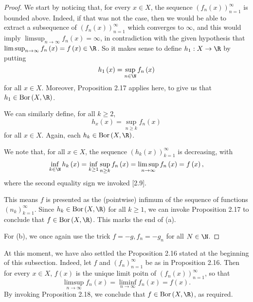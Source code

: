 \documentclass[pmath450]{subfiles}
\begin{document}
    \begin{proof}
        We start by noticing that, for every $x\in X$, the sequence $\left( f_{n}\left( x \right) \right)^{\infty}_{n=1}$ is bounded above. Indeed, if that was not the case, then we would be able to extract a subsequence of $\left( f_{n}\left( x \right) \right)^{\infty}_{n=1}$ which converges to $\infty$, and this would imply $\limsup_{n\to\infty}f_n\left( x \right)=\infty$, in contradiction with the given hypothesis that $\limsup_{n\to\infty}f_n\left( x \right)=f\left( x \right)\in\R$. So it makes sense to define $h_1:X\to\R$ by putting
        \begin{equation*}
            h_1\left( x \right) = \sup_{n\in\N}f_n\left( x \right)
        \end{equation*}
        for all $x\in X$. Moreover, Proposition 2.17 applies here, to give us that $h_1\in\bor\left( X,\R \right)$.

        We can similarly define, for all $k\geq 2$,
        \begin{equation*}
            h_x\left( x \right) = \sup_{n\geq k}f_n\left( x \right)
        \end{equation*}
        for all $x\in X$. Again, each $h_k\in\bor\left( X,\R \right)$.

        We note that, for all $x\in X$, the sequence $\left( h_{k}\left( x \right) \right)^{\infty}_{k=1}$ is decreasing, with
        \begin{equation*}
            \inf_{k\in\N}h_k\left( x \right) = \inf_{k\geq 1}\sup_{n\geq k}f_n\left( x \right) = \limsup_{n\to\infty}f_n\left( x \right)=f\left( x \right),
        \end{equation*}
        where the second equality sign we invoked [2.9].

        This means $f$ is presented as the (pointwise) infimum of the sequence of functions $\left( n_{k} \right)^{\infty}_{k=1}$. Since $h_k\in\bor\left( X,\R \right)$ for all $k\geq 1$, we can invoke Proposition 2.17 to conclude that $f\in\bor\left( X,\R \right)$. This marks the end of (a).

        For (b), we once again use the trick $f=-g, f_n=-g_n$ for all $N\in\N$.
    \end{proof}

    \np At this moment, we have also settled the Proposition 2.16 stated at the beginning of this subsection. Indeed, let $f$ and $\left( f_{n} \right)^{\infty}_{n=1}$ be as in Proposition 2.16. Then for every $x\in X$, $f\left( x \right)$ is the unique limit poitn of $\left( f_{n}\left( x \right) \right)^{\infty}_{n=1}$, so that
    \begin{equation*}
        \limsup_{n\to\infty}f_n\left( x \right)=\liminf_{n\to\infty}f_n\left( x \right)=f\left( x \right).
    \end{equation*}
    By invoking Proposition 2.18, we conclude that $f\in\bor\left( X,\R \right)$, as required.
\end{document}
